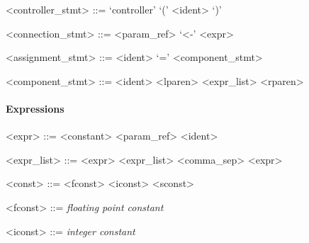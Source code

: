 \vs

\begin{grammar}
  <controller_stmt> ::= `controller' `(' <ident> `)'
\end{grammar}

\vs

\begin{grammar}
  <connection_stmt> ::= <param_ref> `\textless-' <expr>
\end{grammar}

\vs

\begin{grammar}
  <assignment_stmt> ::= <ident> `=' <component_stmt>
\end{grammar}

\vs

\begin{grammar}
  <component_stmt> ::= <ident> <lparen> <expr_list> <rparen>
\end{grammar}


\paragraph{Expressions}

\begin{grammar}
  <expr> ::= <constant>
  \alt <param_ref>
  \alt <ident>
\end{grammar}

\vs

\begin{grammar}
  <expr_list> ::= <expr>
  \alt <expr_list> <comma_sep> <expr>
\end{grammar}

\vs

\begin{grammar}
  <const> ::= <fconst>
  \alt <iconst>
  \alt <sconst>
\end{grammar}

\vs

\begin{grammar}
  <fconst> ::= \emph{floating point constant}
\end{grammar}

\vs

\begin{grammar}
  <iconst> ::= \emph{integer constant}
\end{grammar}

\vs


